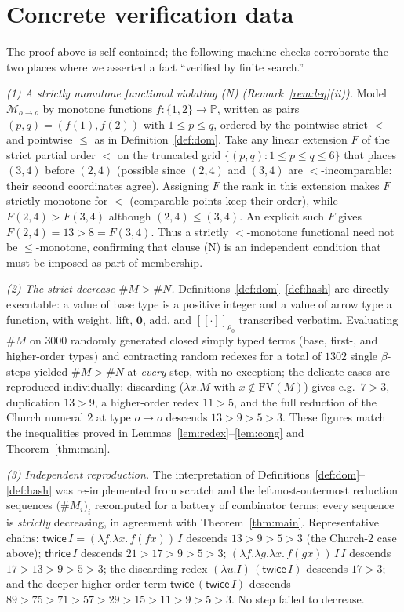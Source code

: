 \documentclass{amsart}
\theoremstyle{definition}
\newcommand{\interp}[1]{[\![#1]\!]}
\newcommand{\FV}{\mathrm{FV}}
\begin{document}
\appendix
\section{Concrete verification data}\label{app:verify}

The proof above is self-contained; the following machine checks corroborate the two places
where we asserted a fact ``verified by finite search.''

\emph{(1) A strictly monotone functional violating (N) (Remark~\ref{rem:leq}(ii)).}
Model $\mathcal M_{o\to o}$ by monotone functions $f:\{1,2\}\to\mathbb P$, written as pairs
$(p,q)=(f(1),f(2))$ with $1\le p\le q$, ordered by the pointwise-strict $<$ and pointwise
$\le$ as in Definition~\ref{def:dom}. Take any linear extension $F$ of the strict partial
order $<$ on the truncated grid $\{(p,q):1\le p\le q\le 6\}$ that places $(3,4)$ before
$(2,4)$ (possible since $(2,4)$ and $(3,4)$ are $<$-incomparable: their second coordinates
agree). Assigning $F$ the rank in this extension makes $F$ strictly monotone for $<$
(comparable points keep their order), while $F(2,4)>F(3,4)$ although $(2,4)\le(3,4)$. An
explicit such $F$ gives $F(2,4)=13>8=F(3,4)$. Thus a strictly $<$-monotone functional need
not be $\le$-monotone, confirming that clause (N) is an independent condition that must be
imposed as part of membership.

\emph{(2) The strict decrease $\#M>\#N$.} Definitions~\ref{def:dom}--\ref{def:hash} are
directly executable: a value of base type is a positive integer and a value of arrow type a
function, with $\mathrm{weight}$, $\mathrm{lift}$, $\mathbf 0$, $\mathrm{add}$, and
$\interp{\cdot}_{\rho_0}$ transcribed verbatim. Evaluating $\#M$ on $3000$ randomly generated
closed simply typed terms (base, first-, and higher-order types) and contracting random
redexes for a total of $1302$ single $\beta$-steps yielded $\#M>\#N$ at \emph{every} step,
with no exception; the delicate cases are reproduced individually: discarding
($\lambda x.M$ with $x\notin\FV(M)$) gives e.g.\ $7>3$, duplication $13>9$, a higher-order
redex $11>5$, and the full reduction of the Church numeral $2$ at type $o\to o$ descends
$13>9>5>3$. These figures match the inequalities proved in
Lemmas~\ref{lem:redex}--\ref{lem:cong} and Theorem~\ref{thm:main}.

\emph{(3) Independent reproduction.} The interpretation of
Definitions~\ref{def:dom}--\ref{def:hash} was re-implemented from scratch and the
leftmost-outermost reduction sequences $\bigl(\#M_i\bigr)_i$ recomputed for a battery of
combinator terms; every sequence is \emph{strictly} decreasing, in agreement with
Theorem~\ref{thm:main}. Representative chains:
$\mathsf{twice}\,I=(\lambda f.\lambda x.\,f(fx))\,I$ descends $13>9>5>3$ (the Church-$2$ case
above); $\mathsf{thrice}\,I$ descends $21>17>9>5>3$; $(\lambda f.\lambda g.\lambda x.\,f(gx))\,I\,I$
descends $17>13>9>5>3$; the discarding redex $(\lambda u.I)\,(\mathsf{twice}\,I)$ descends
$17>3$; and the deeper higher-order term $\mathsf{twice}\,(\mathsf{twice}\,I)$ descends
$89>75>71>57>29>15>11>9>5>3$. No step failed to decrease.
\end{document}
